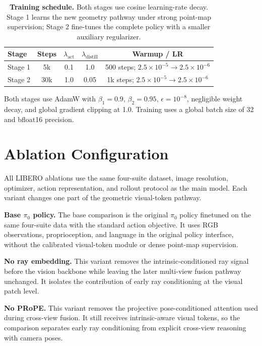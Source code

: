\begin{table}[H]
\centering
\small
\setlength{\tabcolsep}{5pt}
\begin{tabular}{lcccc}
\toprule
\textbf{Stage} & \textbf{Steps} & $\lambda_{\mathrm{act}}$ & $\lambda_{\mathrm{distill}}$ & \textbf{Warmup / LR} \\
\midrule
Stage 1 & 5k & 0.1 & 1.0 & 500 steps; $2.5{\times}10^{-5}\rightarrow2.5{\times}10^{-6}$ \\
Stage 2 & 30k & 1.0 & 0.05 & 1k steps; $2.5{\times}10^{-5}\rightarrow2.5{\times}10^{-6}$ \\
\bottomrule
\end{tabular}
\caption{\textbf{Training schedule.} Both stages use cosine learning-rate decay. Stage 1 learns the new geometry pathway under strong point-map supervision; Stage 2 fine-tunes the complete policy with a smaller auxiliary regularizer.}
\label{tab:appendix_training_schedule}
\end{table}

Both stages use AdamW with $\beta_1=0.9$, $\beta_2=0.95$, $\epsilon=10^{-8}$, negligible weight decay, and global gradient clipping at 1.0. Training uses a global batch size of 32 and bfloat16 precision.

\section{Ablation Configuration}
\label{app:ablation_configuration}

All LIBERO ablations use the same four-suite dataset, image resolution, optimizer, action representation, and rollout protocol as the main model. Each variant changes one part of the geometric visual-token pathway.

\textbf{Base $\pi_0$ policy.}
The base comparison is the original $\pi_0$ policy finetuned on the same four-suite data with the standard action objective. It uses RGB observations, proprioception, and language in the original policy interface, without the calibrated visual-token module or dense point-map supervision.

\textbf{No ray embedding.}
This variant removes the intrinsic-conditioned ray signal before the vision backbone while leaving the later multi-view fusion pathway unchanged. It isolates the contribution of early ray conditioning at the visual patch level.

\textbf{No PRoPE.}
This variant removes the projective pose-conditioned attention used during cross-view fusion. It still receives intrinsic-aware visual tokens, so the comparison separates early ray conditioning from explicit cross-view reasoning with camera poses.

